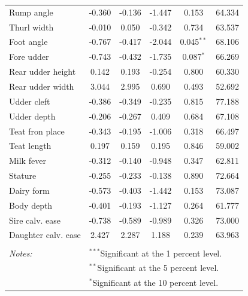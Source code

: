 \begin{table}[H]
{\begin{tabular}{lccccc}
  Rump angle & -0.360 & -0.136 & -1.447 & 0.153 & 64.334 \\ 
  Thurl width & -0.010 & 0.050 & -0.342 & 0.734 & 63.537 \\ 
  Foot angle & -0.767 & -0.417 & -2.044 & 0.045$^{**}$ & 68.106 \\ 
  Fore udder & -0.743 & -0.432 & -1.735 & 0.087$^{*}$ & 66.269 \\ 
  Rear udder height & 0.142 & 0.193 & -0.254 & 0.800 & 60.330 \\ 
  Rear udder width & 3.044 & 2.995 & 0.690 & 0.493 & 52.692 \\ 
  Udder cleft & -0.386 & -0.349 & -0.235 & 0.815 & 77.188 \\ 
  Udder depth & -0.206 & -0.267 & 0.409 & 0.684 & 67.108 \\ 
  Teat fron place & -0.343 & -0.195 & -1.006 & 0.318 & 66.497 \\ 
  Teat length & 0.197 & 0.159 & 0.195 & 0.846 & 59.002 \\ 
  Milk fever & -0.312 & -0.140 & -0.948 & 0.347 & 62.811 \\ 
  Stature & -0.255 & -0.233 & -0.138 & 0.890 & 72.664 \\ 
  Dairy form & -0.573 & -0.403 & -1.442 & 0.153 & 73.087 \\ 
  Body depth & -0.401 & -0.193 & -1.127 & 0.264 & 61.777 \\ 
  Sire calv. ease & -0.738 & -0.589 & -0.989 & 0.326 & 73.000 \\ 
  Daughter calv. ease & 2.427 & 2.287 & 1.188 & 0.239 & 63.963 \\ 
   \hline \\[-1.8ex] 
\textit{Notes:} & \multicolumn{5}{l}{$^{***}$Significant at the 1 percent level.} \\ 
 & \multicolumn{5}{l}{$^{**}$Significant at the 5 percent level.} \\ 
 & \multicolumn{5}{l}{$^{*}$Significant at the 10 percent level.} \\ 
\end{tabular}}
\end{table}
